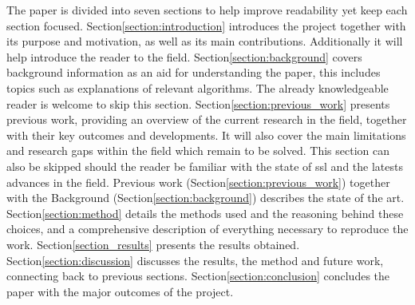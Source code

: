 
The paper is divided into seven sections to help improve readability yet keep each section focused. 
Section\:\ref{section:introduction} introduces the project together with its purpose and motivation, as well as its main contributions. Additionally it will help introduce the reader to the field. 
Section\:\ref{section:background} covers background information as an aid for understanding the paper, this includes topics such as explanations of relevant algorithms. The already knowledgeable reader is welcome to skip this section.
Section\:\ref{section:previous_work} presents previous work, providing an overview of the current research in the field, together with their key outcomes and developments. It will also cover the main limitations and research gaps within the field which remain to be solved. This section can also be skipped should the reader be familiar with the state of \ac{ssl} and the latests advances in the field. Previous work (Section\:\ref{section:previous_work}) together with the Background (Section\:\ref{section:background}) describes the state of the art.
Section\:\ref{section:method} details the methods used and the reasoning behind these choices, and a comprehensive description of everything necessary to reproduce the work.
Section\:\ref{section_results} presents the results obtained.
Section\:\ref{section:discussion} discusses the results, the method and future work, connecting back to previous sections.
Section\:\ref{section:conclusion} concludes the paper with the major outcomes of the project.



